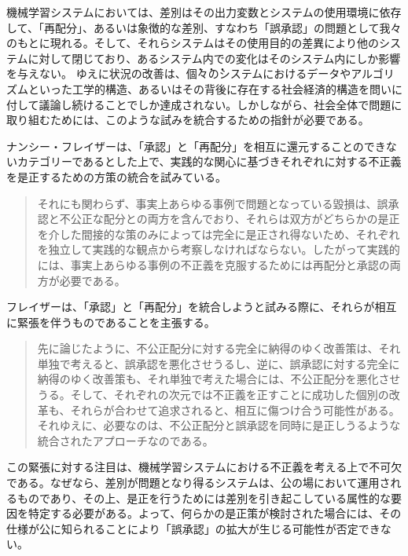 \documentclass[b5j,twoside,twocolumn]{utarticle}
\begin{document}
機械学習システムにおいては、差別はその出力変数とシステムの使用環境に依存して、「再配分」、あるいは象徴的な差別、すなわち「誤承認」の問題として我々のもとに現れる。そして、それらシステムはその使用目的の差異により他のシステムに対して閉じており、あるシステム内での変化はそのシステム内にしか影響を与えない。
ゆえに状況の改善は、\.個\.々\.のシステムにおけるデータやアルゴリズムといった工学的構造、あるいはその背後に存在する社会経済的構造を問いに付して議論し続けることでしか達成されない。しかしながら、社会全体で問題に取り組むためには、このような試みを統合するための指針が必要である。


ナンシー・フレイザーは、「承認」と「再配分」を相互に還元することのできないカテゴリーであるとした上で、実践的な関心に基づきそれぞれに対する不正義を是正するための方策の統合を試みている。
\begin{quote}
それにも関わらず、事実上あらゆる事例で問題となっている毀損は、誤承認と不公正な配分との両方を含んでおり、それらは双方がどちらかの是正を介した間接的な策のみによっては完全に是正され得ないため、それぞれを独立して実践的な観点から考察しなければならない。したがって実践的には、事実上あらゆる事例の不正義を克服するためには再配分と承認の両方が必要である。
\end{quote}
フレイザーは、「承認」と「再配分」を統合しようと試みる際に、それらが相互に緊張を伴うものであることを主張する。
\begin{quote}
先に論じたように、不公正配分に対する完全に納得のゆく改善策は、それ単独で考えると、誤承認を悪化させうるし、逆に、誤承認に対する完全に納得のゆく改善策も、それ単独で考えた場合には、不公正配分を悪化させうる。そして、それぞれの次元では不正義を正すことに成功した個別の改革も、それらが合わせて追求されると、相互に傷つけ合う可能性がある。それゆえに、必要なのは、不公正配分と誤承認を同時に是正しうるような統合されたアプローチなのである。
\end{quote}

この緊張に対する注目は、機械学習システムにおける不正義を考える上で不可欠である。なぜなら、差別が問題となり得るシステムは、公の場において運用されるものであり、その上、是正を行うためには差別を引き起こしている属性的な要因を特定する必要がある。よって、何らかの是正策が検討された場合には、その仕様が公に知られることにより「誤承認」の拡大が生じる可能性が否定できない。
\end{document}
